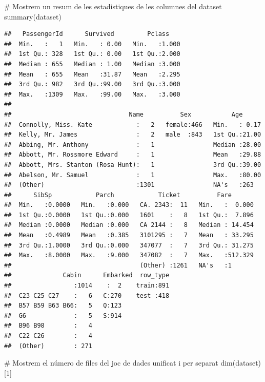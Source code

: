 \documentclass[
]{article}
\newenvironment{Shaded}{\begin{snugshade}}{\end{snugshade}}
\newcommand{\CommentTok}[1]{\textcolor[rgb]{0.50,0.62,0.50}{#1}}
\newcommand{\DecValTok}[1]{\textcolor[rgb]{0.86,0.86,0.80}{#1}}
\newcommand{\FunctionTok}[1]{\textcolor[rgb]{0.94,0.94,0.56}{#1}}
\newcommand{\NormalTok}[1]{\textcolor[rgb]{0.80,0.80,0.80}{#1}}
\begin{document}
\begin{Shaded}
\begin{Highlighting}[]
\CommentTok{\# Mostrem un resum de les estadistiques de les columnes del dataset}
\FunctionTok{summary}\NormalTok{(dataset)}
\end{Highlighting}
\end{Shaded}

\begin{verbatim}
##   PassengerId      Survived         Pclass     
##  Min.   :   1   Min.   : 0.00   Min.   :1.000  
##  1st Qu.: 328   1st Qu.: 0.00   1st Qu.:2.000  
##  Median : 655   Median : 1.00   Median :3.000  
##  Mean   : 655   Mean   :31.87   Mean   :2.295  
##  3rd Qu.: 982   3rd Qu.:99.00   3rd Qu.:3.000  
##  Max.   :1309   Max.   :99.00   Max.   :3.000  
##                                                
##                                Name          Sex           Age       
##  Connolly, Miss. Kate            :   2   female:466   Min.   : 0.17  
##  Kelly, Mr. James                :   2   male  :843   1st Qu.:21.00  
##  Abbing, Mr. Anthony             :   1                Median :28.00  
##  Abbott, Mr. Rossmore Edward     :   1                Mean   :29.88  
##  Abbott, Mrs. Stanton (Rosa Hunt):   1                3rd Qu.:39.00  
##  Abelson, Mr. Samuel             :   1                Max.   :80.00  
##  (Other)                         :1301                NA's   :263    
##      SibSp            Parch            Ticket          Fare        
##  Min.   :0.0000   Min.   :0.000   CA. 2343:  11   Min.   :  0.000  
##  1st Qu.:0.0000   1st Qu.:0.000   1601    :   8   1st Qu.:  7.896  
##  Median :0.0000   Median :0.000   CA 2144 :   8   Median : 14.454  
##  Mean   :0.4989   Mean   :0.385   3101295 :   7   Mean   : 33.295  
##  3rd Qu.:1.0000   3rd Qu.:0.000   347077  :   7   3rd Qu.: 31.275  
##  Max.   :8.0000   Max.   :9.000   347082  :   7   Max.   :512.329  
##                                   (Other) :1261   NA's   :1        
##              Cabin      Embarked  row_type  
##                 :1014    :  2    train:891  
##  C23 C25 C27    :   6   C:270    test :418  
##  B57 B59 B63 B66:   5   Q:123               
##  G6             :   5   S:914               
##  B96 B98        :   4                       
##  C22 C26        :   4                       
##  (Other)        : 271
\end{verbatim}

\begin{Shaded}
\begin{Highlighting}[]
\CommentTok{\# Mostrem el número de files del joc de dades unificat i per separat}
\FunctionTok{dim}\NormalTok{(dataset)[}\DecValTok{1}\NormalTok{]}
\end{Highlighting}
\end{Shaded}
\end{document}
